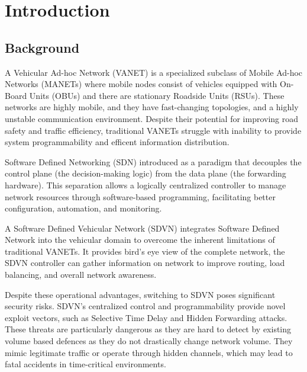 \documentclass[12pt, a4paper]{report}
\begin{document}
\renewcommand{\thepage}{\arabic{page}} %
\setcounter{page}{1} %

\chapter{Introduction}
\section{Background}

A Vehicular Ad-hoc Network (VANET) is a specialized subclass of Mobile Ad-hoc Networks (MANETs) where mobile nodes consist of vehicles equipped with On-Board Units (OBUs) and there are  stationary Roadside Units (RSUs)\cite{Cardona_2020}\cite{s23031600}. These networks are highly mobile, and they have fast-changing topologies, and a highly unstable communication environment\cite{Cardona_2020}\cite{s23031600}. Despite their potential for improving road safety and traffic efficiency, traditional VANETs struggle with inability to provide system programmability and efficent information distribution\cite{KALUPAHANALIYANAGE2018226}\cite{s23031600}.

Software Defined Networking (SDN) introduced as a paradigm that decouples the control plane (the decision-making logic) from the data plane (the forwarding hardware)\cite{PASCOAL2020107223}. This separation allows a logically centralized controller to manage network resources through software-based programming, facilitating better configuration, automation, and monitoring\cite{PASCOAL2020107223}.

A Software Defined Vehicular Network (SDVN) integrates Software Defined Network into the vehicular domain to overcome the inherent limitations of traditional VANETs\cite{KALUPAHANALIYANAGE2018226}\cite{s23031600}. It provides bird’s eye view of the complete network, the SDVN controller can gather information on network to improve routing, load balancing, and overall network awareness.

Despite these operational advantages, switching to SDVN poses significant security risks. SDVN's centralized control and programmability provide novel exploit vectors, such as Selective Time Delay and Hidden Forwarding attacks\cite{9088232}. These threats are particularly dangerous as they are hard to detect by existing volume based defences as they do not drastically change network volume. They mimic legitimate traffic or operate through hidden channels, which may lead to fatal accidents in time-critical environments\cite{PASCOAL2020107223}.
\end{document}
